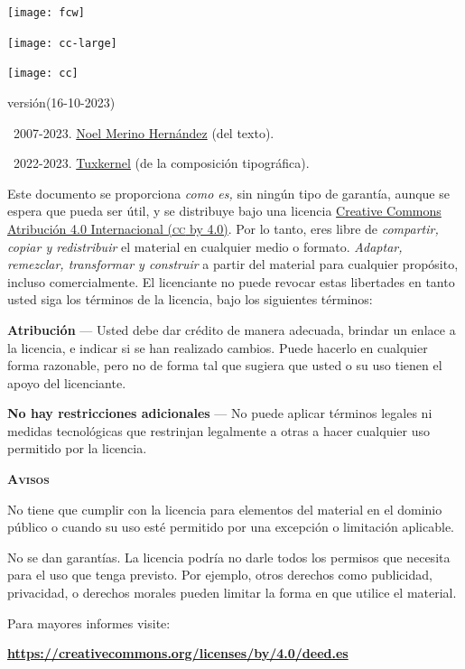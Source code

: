 \documentclass[14pt,twoside,final]{extbook} %
\providecommand\phantomsection{} %
\begin{document}
\newpage
\pagestyle{empty}
\vspace*{0pt}
\vfill
\begin{scriptsize}
\begin{flushleft}
\begin{minipage}{7.5cm}
\texttt{[image: fcw]}\phantomsection\label{fig:free-cultural} \protect\medskip

\texttt{[image: cc-large]}\phantomsection\label{fig:cc-large} \protect\medskip

\texttt{[image: cc]}\phantomsection\label{fig:cc} \protect\medskip

\def\fileversion{1.034}
\def\filedate{(16-10-2023)}
versión\space\fileversion\space\filedate \protect\medskip

\textcopyright\ 2007-2023. \href{noel_merino@yahoo.com.mx}{Noel Merino Hernández} (del texto).

\textcopyright\ 2022-2023. \href{muxkernel@gmail.com}{Tuxkernel} (de la composición tipográfica). \protect\medskip

Este documento se proporciona \emph{como es,} sin ningún tipo de garantía, aunque se espera que pueda ser útil, y se distribuye bajo una licencia \href{https://creativecommons.org/licenses/by/4.0/deed.es}{Creative Commons Atribución 4.0 Internacional (\textsc{cc} by 4.0)}. Por lo tanto, eres libre de \emph{compartir, copiar y redistribuir} el material en cualquier medio o formato. \emph{Adaptar, remezclar, transformar y construir} a partir del material para cualquier propósito, incluso comercialmente. El licenciante no puede revocar estas libertades en tanto usted siga los términos de la licencia, bajo los siguientes términos: \protect\medskip

\textbf{Atribución} --- Usted debe dar crédito de manera adecuada, brindar un enlace a la licencia, e indicar si se han realizado cambios. Puede hacerlo en cualquier forma razonable, pero no de forma tal que sugiera que usted o su uso tienen el apoyo del licenciante. \protect\medskip

\textbf{No hay restricciones adicionales} --- No puede aplicar términos legales ni medidas tecnológicas que restrinjan legalmente a otras a hacer cualquier uso permitido por la licencia. \protect\medskip

\textbf{\textsc{Avisos}} \protect\medskip

No tiene que cumplir con la licencia para elementos del material en el dominio público o cuando su uso esté permitido por una excepción o limitación aplicable. \protect\medskip

No se dan garantías. La licencia podría no darle todos los permisos que necesita para el uso que tenga previsto. Por ejemplo, otros derechos como publicidad, privacidad, o derechos morales pueden limitar la forma en que utilice el material. \protect\medskip

Para mayores informes visite: \protect\medskip

\textbf{\url{https://creativecommons.org/licenses/by/4.0/deed.es}}
\end{minipage}
\end{flushleft}
\end{scriptsize}
\end{document}
